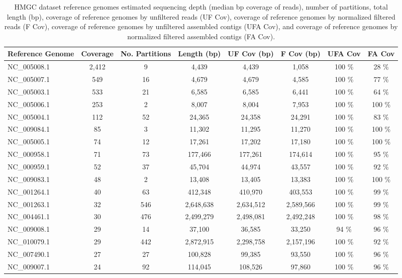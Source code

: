 \documentclass{pnastwo}
\begin{document}
\begin{table}
\caption{HMGC dataset reference genomes estimated sequencing depth
  (median bp coverage of reads), number of partitions, total length
  (bp), coverage of reference genomes by unfiltered reads (UF Cov),
  coverage of reference genomes by normalized filtered reads (F Cov), coverage of
  reference genomes by unfiltered assembled contigs (UFA Cov), and
  coverage of reference genomes by normalized filtered assembled contigs (FA
  Cov).}
\begin{tabular}{@{\extracolsep{\fill}}l c c c c c c c}
\hline Reference Genome & Coverage & No. Partitions & Length (bp) & UF
Cov (bp) & F Cov (bp) & UFA Cov & FA Cov \\ \hline
NC\_005008.1 &
2,412 & 9 & 4,439 & 4,439 & 1,058 & 100 \% & 28 \% \\
NC\_005007.1 &
549 & 16 & 4,679 & 4,679 & 4,585 & 100 \% & 77 \% \\
NC\_005003.1 &
533 & 21 & 6,585 & 6,585 & 6,441 & 100 \% & 64 \% \\
NC\_005006.1 &
253 & 2 & 8,007 & 8,004 & 7,953 & 100 \% & 100 \% \\
NC\_005004.1 &
112 & 52 & 24,365 & 24,358 & 24,291 & 100 \% & 83 \% \\
NC\_009084.1 &
85 & 3 & 11,302 & 11,295 & 11,270 & 100 \% & 100 \% \\
NC\_005005.1 & 74
& 12 & 17,261 & 17,202 & 17,180 & 100 \% & 100 \% \\
NC\_000958.1 & 71
& 73 & 177,466 & 177,261 & 174,614 & 100 \% & 95 \% \\
NC\_000959.1 & 52
& 37 & 45,704 & 44,974 & 43,557 & 100 \% & 92 \% \\
NC\_009083.1 &
48 & 2 & 13,408 & 13,405 & 13,383 & 100 \% & 100 \% \\
NC\_001264.1 & 40
& 63 & 412,348 & 410,970 & 403,553 & 100 \% & 99 \% \\
NC\_001263.1 & 32
& 546 & 2,648,638 & 2,634,512 & 2,589,566 & 100 \% & 99 \% \\
NC\_004461.1 & 30
& 476 & 2,499,279 & 2,498,081 & 2,492,248 & 100 \% & 98 \% \\
NC\_009008.1 &
29 & 14 & 37,100 & 36,585 & 33,250 & 94 \% & 96 \% \\
NC\_010079.1 &
29 & 442 & 2,872,915 & 2,298,758 & 2,157,196 & 100 \% & 92 \% \\
NC\_007490.1 & 27
& 27 & 100,828 & 99,385 & 93,550 & 100 \% & 96 \% \\
NC\_009007.1 &
24 & 92 & 114,045 & 108,526 & 97,860 & 100 \% & 96 \% \\

\end{tabular}
\end{table}
\end{document}

